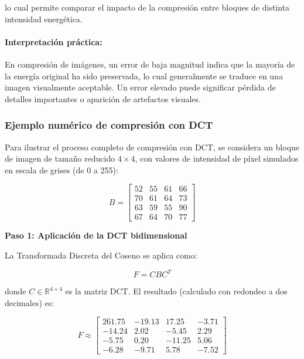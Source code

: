\documentclass[8pt,a4paper]{article}
\theoremstyle{definition}
\theoremstyle{remark}
\begin{document}
\begin{multicols}{2}
            lo cual permite comparar el impacto de la compresión entre bloques de distinta intensidad energética.
            
            \paragraph{Interpretación práctica:} En compresión de imágenes, un error de baja magnitud indica que la mayoría de la energía original ha sido preservada, lo cual generalmente se traduce en una imagen visualmente aceptable. Un error elevado puede significar pérdida de detalles importantes o aparición de artefactos visuales.

            \subsubsection{Ejemplo numérico de compresión con DCT}

            Para ilustrar el proceso completo de compresión con DCT, se considera un bloque de imagen de tamaño reducido \( 4 \times 4 \), con valores de intensidad de píxel simulados en escala de grises (de 0 a 255):
            
            \[
            B =
            \begin{bmatrix}
            52 & 55 & 61 & 66 \\
            70 & 61 & 64 & 73 \\
            63 & 59 & 55 & 90 \\
            67 & 64 & 70 & 77
            \end{bmatrix}
            \]
            
            \textbf{Paso 1: Aplicación de la DCT bidimensional}
            
            La Transformada Discreta del Coseno se aplica como:
            
            \[
            F = C B C^T
            \]
            
            donde \( C \in \mathbb{R}^{4 \times 4} \) es la matriz DCT. El resultado (calculado con redondeo a dos decimales) es:
            
            \[
            F \approx
            \begin{bmatrix}
            261.75 & -19.13 & 17.25 & -3.71 \\
            -14.24 & 2.02 & -5.45 & 2.29 \\
            -5.75 & 0.20 & -11.25 & 5.06 \\
            -6.28 & -9.71 & 5.78 & -7.52
            \end{bmatrix}
            \]
            

\end{multicols}
\end{document}
